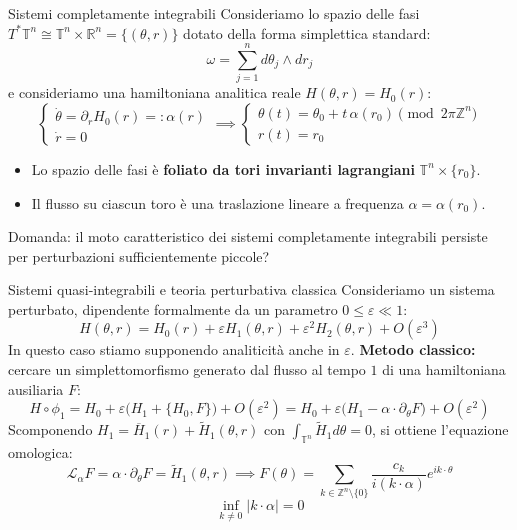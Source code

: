 \documentclass[10pt,aspectratio=169]{beamer}
\newcommand{\T}{\mathbb{T}}
\newcommand{\R}{\mathbb{R}}
\newcommand{\Z}{\mathbb{Z}}
\newcommand{\eps}{\varepsilon}
\newcommand{\blu}[1]{\textcolor{UniBlue}{\textbf{#1}}}
\begin{document}
\begin{frame}{Sistemi completamente integrabili}
  Consideriamo lo spazio delle fasi $T^*\T^n \cong \T^n \times \R^n = \{(\theta, r)\}$ dotato della forma simplettica standard:
  \[
    \omega = \sum_{j=1}^n d\theta_j \wedge dr_j
  \]
  e consideriamo una hamiltoniana analitica reale $H(\theta, r) = H_0(r)$:
    \[
      \begin{cases}
        \dot{\theta} = \partial_r H_0(r) =: \alpha(r) \\
        \dot{r} = 0
      \end{cases}
      \implies 
      \begin{cases}
        \theta(t) = \theta_0 + t\,\alpha(r_0) \pmod{2\pi\Z^n} \\
        r(t) = r_0
      \end{cases}
    \]
  \begin{itemize}
    \item Lo spazio delle fasi è \textbf{foliato da tori invarianti lagrangiani} $\T^n \times \{r_0\}$.
    \item Il flusso su ciascun toro è una traslazione lineare a frequenza $\alpha = \alpha(r_0)$.
  \end{itemize}
   \alert{Domanda:} il moto caratteristico dei sistemi completamente integrabili persiste per perturbazioni sufficientemente piccole?
\end{frame}

\begin{frame}{Sistemi quasi-integrabili e teoria perturbativa classica}
  Consideriamo un sistema perturbato, dipendente formalmente da un parametro $0 \le \eps \ll 1$:
  \[
    H(\theta, r) = H_0(r) + \eps H_1(\theta, r) + \eps^2 H_2(\theta, r) + O(\varepsilon^3)
  \]
  In questo caso stiamo supponendo analiticità anche in $\varepsilon$.
  \bigbreak
  \pause
  \blu{Metodo classico:} cercare un simplettomorfismo generato dal flusso al tempo $1$ di una hamiltoniana ausiliaria $F$:
  \[
    H \circ \phi_1 = H_0 + \eps \big(H_1 + \{H_0, F\}\big) + O(\eps^2) = H_0 + \eps \big(H_1 - \alpha \cdot \partial_\theta F\big) + O(\eps^2)
  \]
  \pause
  Scomponendo $H_1 = \overline{H}_1(r) + \widetilde{H}_1(\theta, r)$ con $\int_{\T^n} \widetilde{H}_1 d\theta = 0$, si ottiene l'\alert{equazione omologica}:
  \[
    \mathcal{L}_\alpha F = \alpha \cdot \partial_\theta F = \widetilde{H}_1(\theta, r) \implies F(\theta) = \sum_{k \in \Z^n \setminus \{0\}} \frac{c_k}{i(k \cdot \alpha)} e^{i k \cdot \theta}
  \]
 \[
    \inf_{k \neq 0}|k \cdot \alpha| = 0
 \]
\end{frame}
\end{document}

